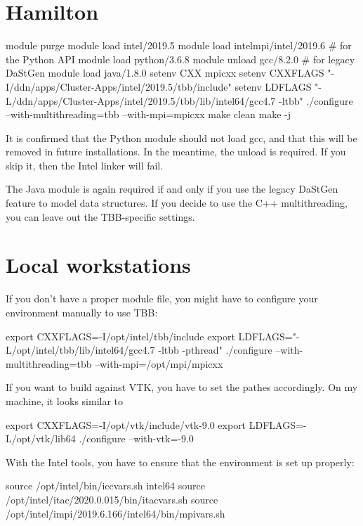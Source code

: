 \section{Hamilton}


\begin{code}
 module purge
 module load intel/2019.5
 module load intelmpi/intel/2019.6
 # for the Python API
 module load python/3.6.8 
 module unload gcc/8.2.0
 # for legacy DaStGen
 module load java/1.8.0
 setenv CXX mpicxx
 setenv CXXFLAGS "-I/ddn/apps/Cluster-Apps/intel/2019.5/tbb/include"
 setenv LDFLAGS "-L/ddn/apps/Cluster-Apps/intel/2019.5/tbb/lib/intel64/gcc4.7 -ltbb"
 ./configure --with-multithreading=tbb --with-mpi=mpicxx
 make clean
 make -j
\end{code}


\begin{remark}
 It is confirmed that the Python module should not load gcc, and that this will
 be removed in future installations.
 In the meantime, the unload is required.
 If you skip it, then the Intel linker will fail.
\end{remark}

\noindent
The Java module is again required if and only if you use the legacy DaStGen
feature to model data structures.
If you decide to use the C++ multithreading, you can leave out the TBB-specific
settings.


\section{Local workstations}


If you don't have a proper module file, you might have to configure your environment manually to use TBB:
\begin{code}
 export CXXFLAGS=-I/opt/intel/tbb/include
 export LDFLAGS="-L/opt/intel/tbb/lib/intel64/gcc4.7 -ltbb -pthread"
 ./configure --with-multithreading=tbb --with-mpi=/opt/mpi/mpicxx
\end{code}


If you want to build against VTK, you have to set the pathes accordingly. 
On my machine, it looks similar to
\begin{code}
 export CXXFLAGS=-I/opt/vtk/include/vtk-9.0
 export LDFLAGS=-L/opt/vtk/lib64
 ./configure --with-vtk=-9.0
\end{code}


With the Intel tools, you have to ensure that the environment is set up 
properly:
\begin{code}
source /opt/intel/bin/iccvars.sh intel64
source /opt/intel/itac/2020.0.015/bin/itacvars.sh
source /opt/intel/impi/2019.6.166/intel64/bin/mpivars.sh
\end{code}



